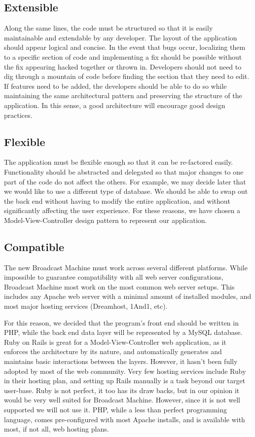 \documentclass[a4paper,12pt]{report}
\begin{document}
\subsection{Extensible} 
Along the same lines, the code must be structured so that it is easily maintainable and extendable by any developer. 
The layout of the application should appear logical and concise. 
In the event that bugs occur, localizing them to a specific section of code and implementing a fix should be possible without the fix appearing hacked together or thrown in. 
Developers should not need to dig through a mountain of code before finding the section that they need to edit. 
If features need to be added, the developers should be able to do so while maintaining the same architectural pattern and preserving the structure of the application. 
In this sense, a good architecture will encourage good design practices. 


\subsection{Flexible}
The application must be flexible enough so that it can be re-factored easily. 
Functionality should be abstracted and delegated so that major changes to one part of the code do not affect the others. 
For example, we may decide later that we would like to use a different type of database. 
We should be able to swap out the back end without having to modify the entire application, and without significantly affecting the user experience. 
For these reasons, we have chosen a Model-View-Controller design pattern to represent our application. 


\subsection{Compatible}
The new Broadcast Machine must work across several different platforms. 
While impossible to guarantee compatibility with all web server configurations, Broadcast Machine most work on the most common web server setups. 
This includes any Apache web server with a minimal amount of installed modules, and most major hosting services (Dreamhost, 1And1, etc). 


For this reason, we decided that the program’s front end should be written in PHP, while the back end data layer will be represented by a MySQL database. 
Ruby on Rails is great for a Model-View-Controller web application, as it enforces the architecture by its nature, and automatically generates and maintains basic interactions between the layers. 
However, it hasn’t been fully adopted by most of the web community.  
Very few hosting services include Ruby in their hosting plan, and setting up Rails manually is a task beyond our target user-base. 
Ruby is not perfect, it too has its draw backs, but in our opinion it would be very well suited for Broadcast Machine. 
However, since it is not well supported we will not use it. 
PHP, while a less than perfect programming language, comes pre-configured with most Apache installs, and is available with most, if not all, web hosting plans. 
\end{document}
